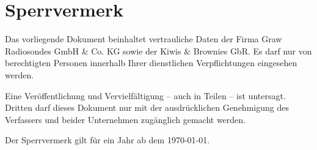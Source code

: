 \newpage


\section*{Sperrvermerk}
Das vorliegende Dokument beinhaltet vertrauliche Daten der Firma Graw Radiosondes GmbH \& Co. KG sowie der Kiwis \& Brownies GbR.
Es darf nur von berechtigten Personen innerhalb Ihrer dienstlichen Verpflichtungen eingesehen werden.

Eine Veröffentlichung und Vervielfältigung – auch in Teilen – ist untersagt.
Dritten darf dieses Dokument nur mit der ausdrücklichen Genehmigung des Verfassers und beider Unternehmen zugänglich gemacht werden.

Der Sperrvermerk gilt für ein Jahr ab dem \today.

